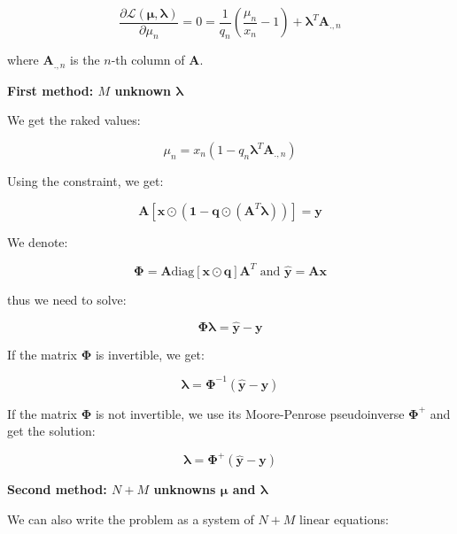 \documentclass{tex/note}
\begin{document}
\begin{equation*}
\frac{\partial \mathcal{L} \left( \bm{\mu} , \bm{\lambda} \right)}{\partial \mu_n} = 0 =
\frac{1}{q_n} \left( \frac{\mu_n}{x_n} - 1 \right) + \bm{\lambda}^T \bm{A}_{.,n}
\end{equation*}

where $\bm{A}_{.,n}$ is the $n$-th column of $\bm{A}$.

\textbf{First method: $M$ unknown $\bm{\lambda}$}

We get the raked values:

\begin{equation*}
\mu_n = x_n \left( 1 - q_n \bm{\lambda}^T \bm{A}_{.,n} \right)
\end{equation*}

Using the constraint, we get:

\begin{equation*}
\bm{A} \left[ \bm{x} \odot \left( \bm{1} - \bm{q} \odot \left( \bm{A}^T \bm{\lambda} \right) \right) \right] = \bm{y}
\end{equation*}

We denote:

\begin{equation*}
\bm{\Phi} = \bm{A} \text{diag} \left[ \bm{x} \odot \bm{q} \right] \bm{A}^T  \text{ and } \hat{\bm{y}} = \bm{A} \bm{x}
\end{equation*}

thus we need to solve:

\begin{equation*}
\bm{\Phi} \bm{\lambda} = \hat{\bm{y}} - \bm{y}
\end{equation*}

If the matrix $\bm{\Phi}$ is invertible, we get:

\begin{equation*}
\bm{\lambda} = \bm{\Phi} ^{-1} \left( \hat{\bm{y}} - \bm{y} \right)
\end{equation*}

If the matrix $\bm{\Phi}$ is not invertible, we use its Moore-Penrose pseudoinverse $\bm{\Phi}^+$ and get the solution:

\begin{equation*}
\bm{\lambda} = \bm{\Phi} ^+ \left( \hat{\bm{y}} - \bm{y} \right)
\end{equation*}

\textbf{Second method: $N + M$ unknowns $\bm{\mu}$ and $\bm{\lambda}$}

We can also write the problem as a system of $N + M$ linear equations:
\end{document}
